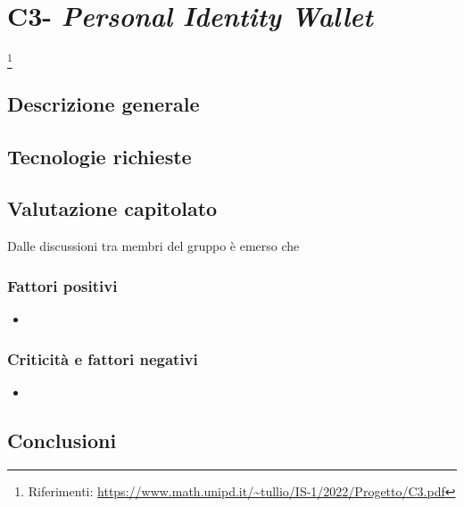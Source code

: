
\renewcommand{\capName}{\textit{Personal Identity Wallet}} %
\renewcommand{\capCode}{C3} %
\renewcommand{\capLink}{https://www.math.unipd.it/~tullio/IS-1/2022/Progetto/C3.pdf} %
\renewcommand{\capProposer}{InfoCert} %


\section{\capCode - \capName} \footnote{Riferimenti: \url{\capLink}}
\subsection{Descrizione generale}

\subsection{Tecnologie richieste}

\subsection{Valutazione capitolato}
Dalle discussioni tra membri del gruppo è emerso che

\subsubsection{Fattori positivi}

\begin{itemize}
    \item 
\end{itemize}

\subsubsection{Criticità e fattori negativi}

\begin{itemize}
    \item 
\end{itemize}

\subsection{Conclusioni}